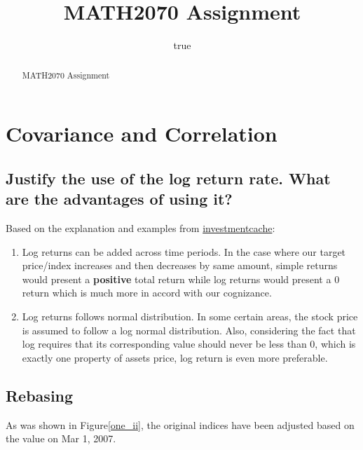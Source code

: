 \documentclass[
]{article}
\title{MATH2070 Assignment}
\author{true}
\date{}
\begin{document}
\maketitle
\begin{abstract}
MATH2070 Assignment
\end{abstract}

\hypertarget{covariance-and-correlation}{%
\section{Covariance and Correlation}\label{covariance-and-correlation}}

\hypertarget{justify-the-use-of-the-log-return-rate.-what-are-the-advantages-of-using-it}{%
\subsection{Justify the use of the log return rate. What are the
advantages of using
it?}\label{justify-the-use-of-the-log-return-rate.-what-are-the-advantages-of-using-it}}

Based on the explanation and examples from
\href{https://investmentcache.com/magic-of-log-returns-concept-part-1/}{investmentcache}:

\begin{enumerate}
\def\labelenumi{\arabic{enumi}.}
\item
  Log returns can be added across time periods. In the case where our
  target price/index increases and then decreases by same amount, simple
  returns would present a \textbf{positive} total return while log
  returns would present a 0 return which is much more in accord with our
  cognizance.
\item
  Log returns follows normal distribution. In some certain areas, the
  stock price is assumed to follow a log normal distribution. Also,
  considering the fact that log requires that its corresponding value
  should never be less than 0, which is exactly one property of assets
  price, log return is even more preferable.
\end{enumerate}

\hypertarget{rebasing}{%
\subsection{Rebasing}\label{rebasing}}

As was shown in Figure\ref{one_ii}, the original indices have been
adjusted based on the value on Mar 1, 2007.
\end{document}
